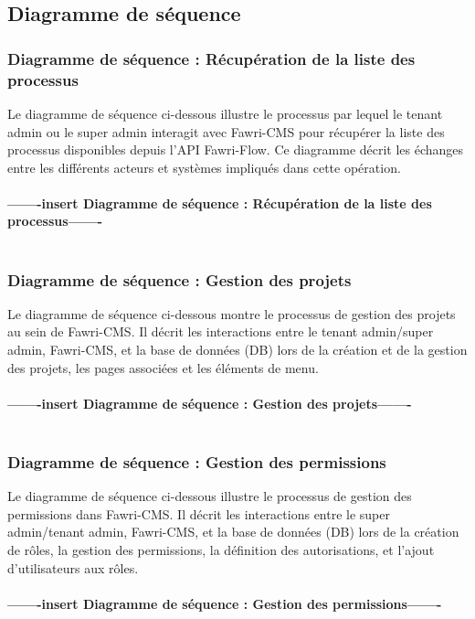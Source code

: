 \subsection{Diagramme de séquence}


\subsubsection{Diagramme de séquence : Récupération de la liste des processus}

\hspace{\parindent}Le diagramme de séquence ci-dessous illustre le processus par lequel le tenant admin ou le super admin interagit avec Fawri-CMS pour récupérer la liste des processus disponibles depuis l'API Fawri-Flow. Ce diagramme décrit les échanges entre les différents acteurs et systèmes impliqués dans cette opération.
\\
\\
\textbf{-------insert Diagramme de séquence : Récupération de la liste des processus-------}
\\
\\


\subsubsection{Diagramme de séquence : Gestion des projets}
\hspace{\parindent}Le diagramme de séquence ci-dessous montre le processus de gestion des projets au sein de Fawri-CMS. Il décrit les interactions entre le tenant admin/super admin, Fawri-CMS, et la base de données (DB) lors de la création et de la gestion des projets, les pages associées et les éléments de menu.
\\
\\
\textbf{-------insert Diagramme de séquence : Gestion des projets-------}
\\
\\




\subsubsection{Diagramme de séquence : Gestion des permissions}
\hspace{\parindent}Le diagramme de séquence ci-dessous illustre le processus de gestion des permissions dans Fawri-CMS. Il décrit les interactions entre le super admin/tenant admin, Fawri-CMS, et la base de données (DB) lors de la création de rôles, la gestion des permissions, la définition des autorisations, et l'ajout d'utilisateurs aux rôles.
\\
\\
\textbf{-------insert Diagramme de séquence : Gestion des permissions-------}
\\
\\



